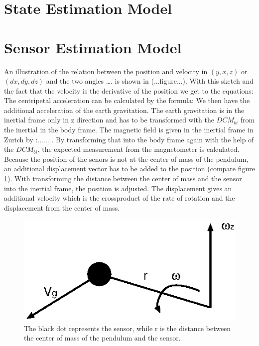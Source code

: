 \section{State Estimation Model}\label{state_estimation}
\section{Sensor Estimation Model}\label{sensor_estimation}
An illustration of the relation between the position and velocity in $(y,x,z)$ or $(dx,dy,dz)$ and the two angles …. is shown in (...figure...). With this sketch and the fact that the velocity is the derivative of the position we get to the equations: 
The centripetal acceleration can be calculated by the formula:
We then have the additional acceleration of the earth gravitation. The earth gravitation is in the inertial frame only in z direction and has to be transformed with the $DCM_{bi}$ from the inertial in the body frame. The magnetic field is given in the inertial frame in Zurich by :...... . By transforming that into the body frame again with the help of the $DCM_{bi}$, the expected measurement from the magnetometer is calculated. Because the position of the senors is not at the center of mass of the pendulum, an additional displacement vector has to be added to the position (compare figure \ref{displacement}). With transforming the distance between the center of mass and the sensor into the inertial frame, the position is adjusted. The displacement gives an additional velocity which is the crossproduct of the rate of rotation and the displacement from the center of mass.
\begin{figure}[h]
\begin{center}
\includegraphics[width=8 cm]{pictures/displacement_1.eps}
\caption{The black dot represents the sensor, while r is the distance between the center of mass of the pendulum and the sensor.}
\label{displacement}
\end{center}
\end{figure}


